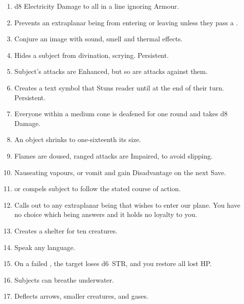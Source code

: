 \documentclass[itdr]{subfiles}
\begin{document}
\begin{enumerate}
	\item {} d8 Electricity Damage to all in a line ignoring Armour.
	\item {} Prevents an extraplanar being from entering or leaving unless they pass a .
	\item {} Conjure an image with sound, smell and thermal effects.
	\item {} Hides a subject from divination, scrying. Persistent.
	\item {} Subject's attacks are Enhanced, but so are attacks against them.
	\item {} Creates a text symbol that Stuns reader until  at the end of their turn. Persistent.
	\item {} Everyone within a medium cone is deafened for one round and takes d8 Damage.
	\item {} An object shrinks to one-sixteenth its size.
	\item {} Flames are doused, ranged attacks are Impaired,  to avoid slipping.
	\item {} Nauseating vapours,  or vomit and gain Disadvantage on the next Save.
	\item {}  or compels subject to follow the stated course of action.
	\item {} Calls out to any extraplanar being that wishes to enter our plane. You have no choice which being answers and it holds no loyalty to you.
	\item {} Creates a shelter for ten creatures.
	\item {} Speak any language.
	\item {} On a failed , the target loses d6~STR, and you restore all lost HP.
	\item {} Subjects can breathe underwater.
	\item {} Deflects arrows, smaller creatures, and gases.
\end{enumerate}


\vfill
\break
\end{document}
